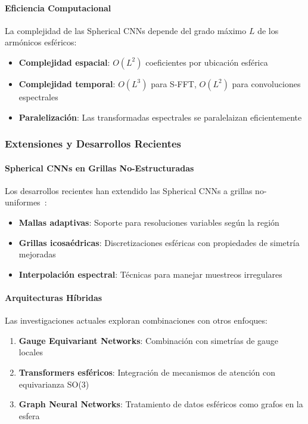 \paragraph{Eficiencia Computacional}

La complejidad de las Spherical CNNs depende del grado máximo $L$ de los armónicos esféricos:

\begin{itemize}
    \item \textbf{Complejidad espacial}: $O(L^2)$ coeficientes por ubicación esférica
    \item \textbf{Complejidad temporal}: $O(L^3)$ para S-FFT, $O(L^2)$ para convoluciones espectrales
    \item \textbf{Paralelización}: Las transformadas espectrales se paralelaizan eficientemente
\end{itemize}

\subsubsection{Extensiones y Desarrollos Recientes}

\paragraph{Spherical CNNs en Grillas No-Estructuradas}

Los desarrollos recientes han extendido las Spherical CNNs a grillas no-uniformes~\citep{cohen2021spherical}:

\begin{itemize}
    \item \textbf{Mallas adaptivas}: Soporte para resoluciones variables según la región
    \item \textbf{Grillas icosaédricas}: Discretizaciones esféricas con propiedades de simetría mejoradas
    \item \textbf{Interpolación espectral}: Técnicas para manejar muestreos irregulares
\end{itemize}

\paragraph{Arquitecturas Híbridas}

Las investigaciones actuales exploran combinaciones con otros enfoques:

\begin{enumerate}
    \item \textbf{Gauge Equivariant Networks}: Combinación con simetrías de gauge locales~\citep{cohen2019gaugeequivariantconvolutional}
    \item \textbf{Transformers esféricos}: Integración de mecanismos de atención con equivarianza SO(3)
    \item \textbf{Graph Neural Networks}: Tratamiento de datos esféricos como grafos en la esfera
\end{enumerate}

